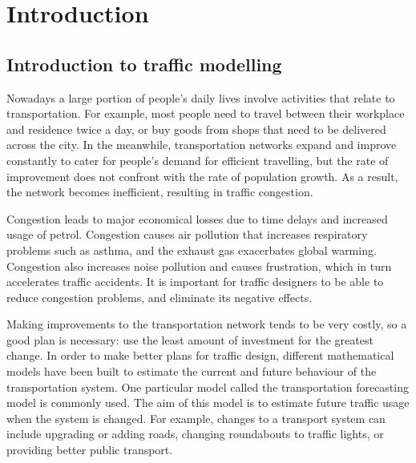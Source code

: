 \chapter{Introduction}
\section{Introduction to traffic modelling}
Nowadays a large portion of people's daily lives involve activities that relate to transportation.
For example, most people need to travel between their workplace and residence twice a day,
or buy goods from shops that need to be delivered across the city.
In the meanwhile, 
transportation networks expand and improve constantly to cater for people's demand for efficient travelling,
but the rate of improvement does not confront with the rate of population growth.
As a result,
the network becomes inefficient, resulting in traffic congestion.

Congestion leads to major economical losses due to time delays and increased usage of petrol.
Congestion causes air pollution that increases respiratory problems such as asthma, 
and the exhaust gas exacerbates global warming.
Congestion also increases noise pollution and causes frustration,
which in turn accelerates traffic accidents.
It is important for traffic designers to be able to reduce congestion problems,
and eliminate its negative effects.

Making improvements to the transportation network tends to be very costly,
so a good plan is necessary:
use the least amount of investment for the greatest change.
In order to make better plans for traffic design,
different mathematical models have been built to estimate the current and future behaviour of the transportation system.
One particular model called the transportation forecasting model is commonly used.
The aim of this model is to estimate future traffic usage when the system is changed.
For example, changes to a transport system can include upgrading or adding roads, changing roundabouts to traffic lights, or providing better public transport. 

